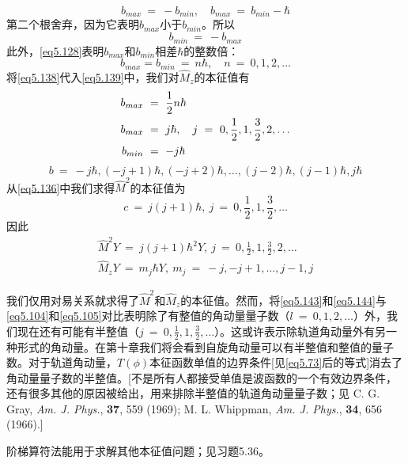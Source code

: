 \documentclass[12pt,a4paper,openany]{ctexbook}
\begin{document}
\begin{flushleft}
\begin{equation*}
    b_{max}\ =\ -b_{min},\quad b_{max}\ =\ b_{min}-\hbar
\end{equation*}
第二个根舍弃，因为它表明$b_{max}$小于$b_{min}$。所以
\begin{equation}
    b_{min}\ =\ -b_{max} \label{eq5.138}
\end{equation}
此外，\eqref{eq5.128}表明$b_{max}$和$b_{min}$相差$\hbar$的整数倍：
\begin{equation}
    b_{max}=b_{min}\ =\ n\hbar,\quad n\ =\ 0,1,2,\dots \label{eq5.139}
\end{equation}
将\eqref{eq5.138}代入\eqref{eq5.139}中，我们对$\hat{M}_z$的本征值有
\begin{align}
    b_{max}\ &=\ \frac{1}{2}n\hbar \notag \\
    b_{max}\ &=\ j\hbar,\quad j\ =\ 0,\frac{1}{2},1,\frac{3}{2},2,\dots \label{eq5.140} \\
    b_{min}\ &=\ -j\hbar \notag
\end{align}
\begin{equation}
    b\ =\ -j\hbar,(-j+1)\hbar,(-j+2)\hbar,\dots,(j-2)\hbar,(j-1)\hbar,j\hbar \label{eq5.141}
\end{equation}
从\eqref{eq5.136}中我们求得$\hat{M}^2$的本征值为
\begin{equation}
    c\ =\ j(j+1)\hbar,\ j\ =\ 0,\frac{1}{2},1,\frac{3}{2},\dots \label{eq5.142}
\end{equation}
因此
\begin{gather}
    \hat{M}^2Y\ =\ j(j+1)\hbar^2Y,\ j\ =\ 0,\frac{1}{2},1,\frac{3}{2},2,\dots \label{eq5.143} \\
    \hat{M}_zY\ =\ m_j\hbar Y,\ m_j\ =\ -j,-j+1,\dots,j-1,j \label{eq5.144}
\end{gather}

我们仅用对易关系就求得了$\hat{M}^2$和$\hat{M}_z$的本征值。然而，将\eqref{eq5.143}和\eqref{eq5.144}与\eqref{eq5.104}和\eqref{eq5.105}对比表明除了有整值的角动量量子数（$l\ =\ 0,1,2,\dots$）外，我们现在还有可能有半整值（$j\ =\ 0,\frac{1}{2},1,\frac{3}{2},\dots$）。这或许表示除轨道角动量外有另一种形式的角动量。在第十章我们将会看到自旋角动量可以有半整值和整值的量子数。对于轨道角动量，$T(\phi)$本征函数单值的边界条件[见\eqref{eq5.73}后的等式]消去了角动量量子数的半整值。[不是所有人都接受单值是波函数的一个有效边界条件，还有很多其他的原因被给出，用来排除半整值的轨道角动量量子数；见 C. G. Gray, \textit{Am. J. Phys.}, \textbf{37}, 559 (1969); M. L. Whippman, \textit{Am. J. Phys.}, \textbf{34}, 656 (1966).]

阶梯算符法能用于求解其他本征值问题；见习题5.36。
\end{flushleft}
\end{document}
